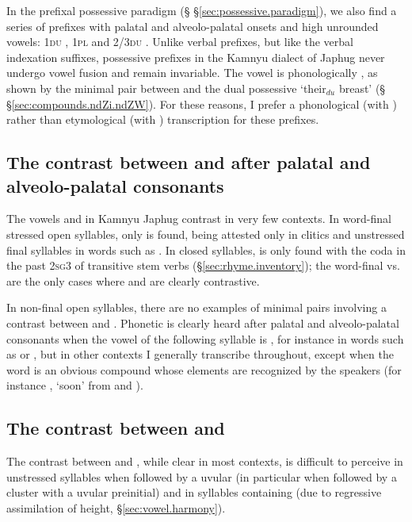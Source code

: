 In the prefixal possessive paradigm (§ §\ref{sec:possessive.paradigm}), we also find a series of prefixes with palatal and alveolo-palatal onsets and high unrounded vowels: \textsc{1du} , \textsc{1pl}  and \textsc{2/3du} . Unlike verbal prefixes, but like the verbal indexation suffixes, possessive prefixes in the Kamnyu dialect of Japhug never undergo vowel fusion and remain invariable. The vowel is phonologically , as shown by the minimal pair between  and the dual possessive  `their$_{du}$ breast' (§ §\ref{sec:compounds.ndZi.ndZW}). For these reasons, I prefer a phonological (with ) rather than etymological (with ) transcription for these prefixes.

\subsection{The contrast between  and  after palatal and alveolo-palatal consonants}
The vowels  and  in Kamnyu Japhug contrast in very few contexts. In word-final stressed open syllables, only  is found,  being attested only in clitics and unstressed final syllables in words such as . In closed syllables,  is only found with the coda  in the past \textsc{2sg}\fl{}3 of transitive  stem verbs (§\ref{sec:rhyme.inventory}); the word-final  vs.  are the only cases where  and  are clearly contrastive.

In non-final open syllables, there are no examples of minimal pairs involving a contrast between  and . Phonetic  is clearly heard after palatal and alveolo-palatal consonants when the vowel of the following syllable is , for instance in words such as  or , but in other contexts I generally transcribe  throughout, except when the word is an obvious compound whose elements are recognized by the speakers (for instance , `soon' from  and ). 

\subsection{The contrast between  and } \label{sec:A.vs.a.prefixes}
The contrast between  and , while clear in most contexts, is difficult to perceive in unstressed syllables when followed by a uvular (in particular when followed by a cluster with a uvular preinitial) and in syllables containing  (due to regressive assimilation of height, §\ref{sec:vowel.harmony}).


